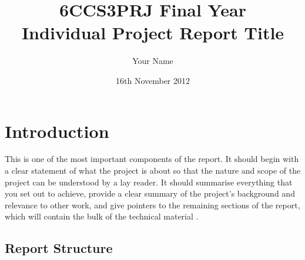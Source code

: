 \documentclass[11pt]{informatics-report}
\title{6CCS3PRJ Final Year\\\vspace{0.2cm}Individual Project Report Title}
\author{Your Name}
\date{16th November 2012}
\begin{document}
\createFrontMatter
\onehalfspacing
\tableofcontents
\doublespacing


\chapter{Introduction}
This is one of the most important components of the report. It should begin with a clear statement of what the project is about so that the nature and scope of the project can be understood by a lay reader. It should summarise everything that you set out to achieve, provide a clear summary of the project's background and relevance to other work, and give pointers to the remaining sections of the report, which will contain the bulk of the technical material \cite{refLabel}.

\section{Report Structure}












\appendix



\end{document}
